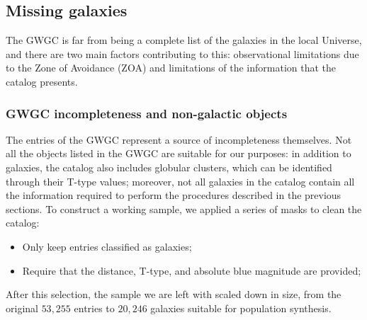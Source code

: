 \subsection{Missing galaxies}
The GWGC is far from being a complete list of the galaxies in the local Universe, and there are two main factors contributing to this: observational limitations due to the Zone of Avoidance (ZOA) and limitations of the information that the catalog presents.

\subsubsection{GWGC incompleteness and non-galactic objects}
The entries of the GWGC represent a source of incompleteness themselves. 
Not all the objects listed in the GWGC are suitable for our purposes:
in addition to galaxies, the catalog also includes globular clusters, which can be identified through their T-type values; 
moreover, not all galaxies in the catalog contain all the information required to perform the procedures described in the previous sections.
To construct a working sample, we applied a series of masks to clean the catalog:
\begin{itemize}
    \item Only keep entries classified as galaxies; 
    \item Require that the distance, T-type, and absolute blue magnitude are provided; 
\end{itemize}
After this selection, the sample we are left with scaled down in size, from the original $53,255$ entries to $20,246$ galaxies suitable for population synthesis.

